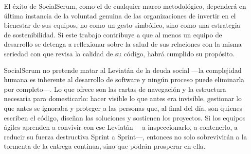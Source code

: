 El éxito de SocialScrum, como el de cualquier marco metodológico, dependerá en última instancia de la voluntad genuina de las organizaciones de invertir en el bienestar de sus equipos, no como un gesto simbólico, sino como una estrategia de sostenibilidad. Si este trabajo contribuye a que al menos un equipo de desarrollo se detenga a reflexionar sobre la salud de sus relaciones con la misma seriedad con que revisa la calidad de su código, habrá cumplido su propósito.

SocialScrum no pretende matar al Leviatán de la deuda social ---la complejidad humana es inherente al desarrollo de software y ningún proceso puede eliminarla por completo---. Lo que ofrece son las cartas de navegación y la estructura necesaria para domesticarlo: hacer visible lo que antes era invisible, gestionar lo que antes se ignoraba y proteger a las personas que, al final del día, son quienes escriben el código, diseñan las soluciones y sostienen los proyectos. Si los equipos ágiles aprenden a convivir con ese Leviatán ---a inspeccionarlo, a contenerlo, a reducir su fuerza destructiva Sprint a Sprint---, entonces no solo sobrevivirán a la tormenta de la entrega continua, sino que podrán prosperar en ella.